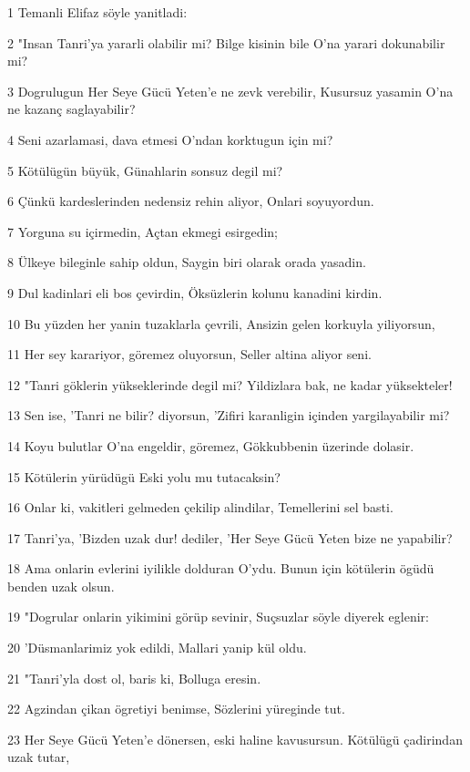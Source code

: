 \par 1 Temanli Elifaz söyle yanitladi:
\par 2 "Insan Tanri'ya yararli olabilir mi? Bilge kisinin bile O'na yarari dokunabilir mi?
\par 3 Dogrulugun Her Seye Gücü Yeten'e ne zevk verebilir, Kusursuz yasamin O'na ne kazanç saglayabilir?
\par 4 Seni azarlamasi, dava etmesi O'ndan korktugun için mi?
\par 5 Kötülügün büyük, Günahlarin sonsuz degil mi?
\par 6 Çünkü kardeslerinden nedensiz rehin aliyor, Onlari soyuyordun.
\par 7 Yorguna su içirmedin, Açtan ekmegi esirgedin;
\par 8 Ülkeye bileginle sahip oldun, Saygin biri olarak orada yasadin.
\par 9 Dul kadinlari eli bos çevirdin, Öksüzlerin kolunu kanadini kirdin.
\par 10 Bu yüzden her yanin tuzaklarla çevrili, Ansizin gelen korkuyla yiliyorsun,
\par 11 Her sey karariyor, göremez oluyorsun, Seller altina aliyor seni.
\par 12 "Tanri göklerin yükseklerinde degil mi? Yildizlara bak, ne kadar yüksekteler!
\par 13 Sen ise, 'Tanri ne bilir? diyorsun, 'Zifiri karanligin içinden yargilayabilir mi?
\par 14 Koyu bulutlar O'na engeldir, göremez, Gökkubbenin üzerinde dolasir.
\par 15 Kötülerin yürüdügü Eski yolu mu tutacaksin?
\par 16 Onlar ki, vakitleri gelmeden çekilip alindilar, Temellerini sel basti.
\par 17 Tanri'ya, 'Bizden uzak dur! dediler, 'Her Seye Gücü Yeten bize ne yapabilir?
\par 18 Ama onlarin evlerini iyilikle dolduran O'ydu. Bunun için kötülerin ögüdü benden uzak olsun.
\par 19 "Dogrular onlarin yikimini görüp sevinir, Suçsuzlar söyle diyerek eglenir:
\par 20 'Düsmanlarimiz yok edildi, Mallari yanip kül oldu.
\par 21 "Tanri'yla dost ol, baris ki, Bolluga eresin.
\par 22 Agzindan çikan ögretiyi benimse, Sözlerini yüreginde tut.
\par 23 Her Seye Gücü Yeten'e dönersen, eski haline kavusursun. Kötülügü çadirindan uzak tutar,
